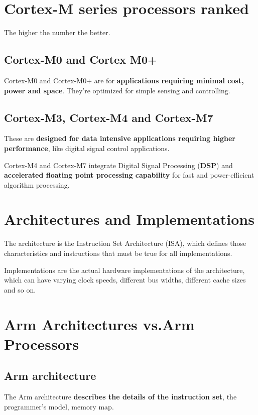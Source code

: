 \section{Cortex-M series processors ranked}
The higher the number the better.

\subsection*{Cortex-M0 and Cortex M0+}

Cortex-M0 and Cortex-M0+ are for \textbf{applications requiring minimal cost, power and space}.
They're optimized for simple sensing and controlling.

\subsection*{Cortex-M3, Cortex-M4 and Cortex-M7}

These are \textbf{designed for data intensive applications requiring
higher performance}, like digital signal control applications. 

Cortex-M4 and Cortex-M7 integrate Digital Signal Processing (\textbf{DSP}) and \textbf{accelerated floating point processing capability} for fast and
power-efficient algorithm processing.

\section{Architectures and Implementations}

The architecture is the Instruction Set Architecture (ISA), which defines those characteristics and
instructions that must be true for all implementations.

Implementations are the actual hardware implementations of the architecture, which can have varying
clock speeds, different bus widths, different cache sizes and so on.


\section{Arm Architectures vs.Arm Processors}

\subsection*{Arm architecture}

The Arm architecture \textbf{describes the details of the instruction set}, the programmer's model, memory map.

